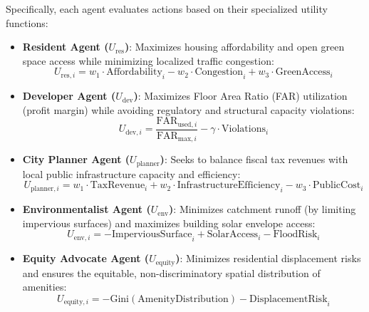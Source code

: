 \documentclass[final,3p,times]{elsarticle}
\begin{document}
Specifically, each agent evaluates actions based on their specialized utility functions:
\begin{itemize}
    \item \textbf{Resident Agent ($U_{\text{res}}$)}: Maximizes housing affordability and open green space access while minimizing localized traffic congestion:
    \begin{equation}
    U_{\text{res}, i} = w_1 \cdot \text{Affordability}_i - w_2 \cdot \text{Congestion}_i + w_3 \cdot \text{GreenAccess}_i
    \end{equation}
    
    \item \textbf{Developer Agent ($U_{\text{dev}}$)}: Maximizes Floor Area Ratio (FAR) utilization (profit margin) while avoiding regulatory and structural capacity violations:
    \begin{equation}
    U_{\text{dev}, i} = \frac{\text{FAR}_{\text{used}, i}}{\text{FAR}_{\text{max}, i}} - \gamma \cdot \text{Violations}_i
    \end{equation}
    
    \item \textbf{City Planner Agent ($U_{\text{planner}}$)}: Seeks to balance fiscal tax revenues with local public infrastructure capacity and efficiency:
    \begin{equation}
    U_{\text{planner}, i} = w_1 \cdot \text{TaxRevenue}_i + w_2 \cdot \text{InfrastructureEfficiency}_i - w_3 \cdot \text{PublicCost}_i
    \end{equation}
    
    \item \textbf{Environmentalist Agent ($U_{\text{env}}$)}: Minimizes catchment runoff (by limiting impervious surfaces) and maximizes building solar envelope access:
    \begin{equation}
    U_{\text{env}, i} = -\text{ImperviousSurface}_i + \text{SolarAccess}_i - \text{FloodRisk}_i
    \end{equation}
    
    \item \textbf{Equity Advocate Agent ($U_{\text{equity}}$)}: Minimizes residential displacement risks and ensures the equitable, non-discriminatory spatial distribution of amenities:
    \begin{equation}
    U_{\text{equity}, i} = -\text{Gini}(\text{AmenityDistribution}) - \text{DisplacementRisk}_i
    \end{equation}
\end{itemize}
\end{document}
